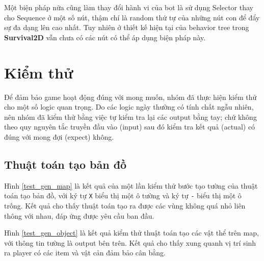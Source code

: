 \documentclass[12pt,a4paper]{article}
\begin{document}
  Một biện pháp nữa cũng làm thay đổi hành vi của bot là sử dụng Selector thay cho Sequence ở một số nút, thậm chí là random thứ tự của những nút con để đẩy sự đa dạng lên cao nhất. Tuy nhiên ở thiết kế hiện tại của behavior tree trong \textbf{Survival2D} vẫn chưa có các nút có thể áp dụng biện pháp này.

  \newpage
  \section{Kiểm thử}
  Để đảm bảo game hoạt động đúng với mong muốn, nhóm đã thực hiện kiểm thử cho một số logic quan trọng. Do các logic ngày thường có tính chất ngẫu nhiên, nên nhóm đã kiểm thử bằng việc tự kiểm tra lại các output bằng tay; chứ không theo quy nguyên tắc truyền đầu vào (input) sau đó kiểm tra kết quả (actual) có đúng với mong đợi (expect) không.

  \subsection{Thuật toán tạo bản đồ}
  Hình \ref{test_gen_map} là kết quả của một lần kiểm thử bước tạo tường của thuật toán tạo bản đồ, với ký tự \texttt{X} biểu thị một ô tường và ký tự \texttt{-} biểu thị một ô trống. Kết quả cho thấy thuật toán tạo ra được các vùng không quá nhỏ liên thông với nhau, đáp ứng được yêu cầu ban đầu.

  Hình \ref{test_gen_object} là kết quả kiểm thử thuật toán tạo các vật thể trên map, với thông tin tường là output bên trên. Kết quả cho thấy xung quanh vị trí sinh ra player có các item và vật cản đảm bảo cân bằng.
\end{document}
